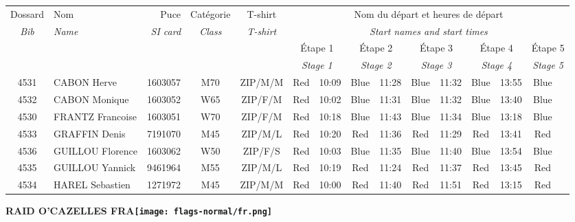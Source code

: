 \documentclass{report}
\begin{document}
  \begin{longtable}{|c|l|r|c|c|*{5}{cc|}}
    Dossard & Nom  & Puce    & Catégorie & T-shirt & \multicolumn{10}{c|}{Nom du départ et heures de départ} \\
    \itshape Bib     & \itshape Name & \itshape SI card & \itshape Class  & \itshape  T-shirt  & \multicolumn{10}{c|}{\itshape Start names and start times} \\
    \hline
    & & & & & \multicolumn{2}{c|}{Étape 1} & \multicolumn{2}{c|}{Étape 2} & \multicolumn{2}{c|}{Étape 3} & \multicolumn{2}{c|}{Étape 4} & \multicolumn{2}{c|}{Étape 5} \\
    & & & & & \multicolumn{2}{c|}{\itshape Stage 1} & \multicolumn{2}{c|}{\itshape Stage 2} & \multicolumn{2}{c|}{\itshape Stage 3} & \multicolumn{2}{c|}{\itshape Stage 4} & \multicolumn{2}{c|}{\itshape Stage 5} \\
    \hline
    4531 & CABON Herve & 1603057 & M70 & ZIP/M/M & Red & 10:09 & Blue & 11:28 & Blue & 11:32 & Blue & 13:55 & Blue &  \\
    4532 & CABON Monique & 1603052 & W65 & ZIP/F/M & Red & 10:02 & Blue & 11:31 & Blue & 11:32 & Blue & 13:40 & Blue &  \\
    4530 & FRANTZ Francoise & 1603051 & W70 & ZIP/F/M & Red & 10:18 & Blue & 11:43 & Blue & 11:34 & Blue & 13:18 & Blue &  \\
    4533 & GRAFFIN Denis & 7191070 & M45 & ZIP/M/L & Red & 10:20 & Red & 11:36 & Red & 11:29 & Red & 13:41 & Red &  \\
    4536 & GUILLOU Florence & 1603062 & W50 & ZIP/F/S & Red & 10:03 & Blue & 11:35 & Blue & 11:40 & Blue & 13:54 & Blue &  \\
    4535 & GUILLOU Yannick & 9461964 & M55 & ZIP/M/L & Red & 10:19 & Red & 11:24 & Red & 11:37 & Red & 13:45 & Red &  \\
    4534 & HAREL Sebastien & 1271972 & M45 & ZIP/M/M & Red & 10:00 & Red & 11:40 & Red & 11:51 & Red & 13:15 & Red &  \\
  \end{longtable}
\newpage
  \Huge \centering \bfseries RAID O'CAZELLES  FRA\normalfont \footnotesize \sffamily \hfill \texttt{[image: flags-normal/fr.png]} \newline 
\end{document}
